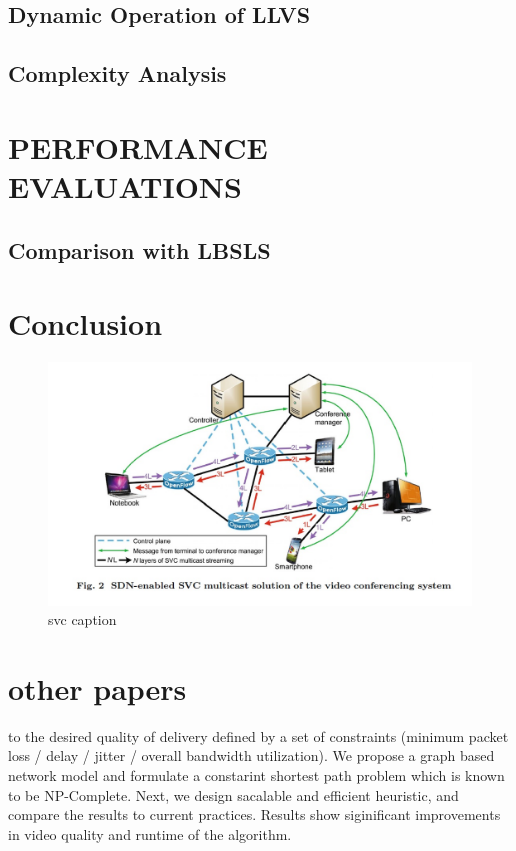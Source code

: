 \documentclass[a4paper, 10pt, conference]{ieeeconf}
\begin{document}
\subsection{Dynamic Operation of LLVS}
\subsection{Complexity Analysis}

\section{PERFORMANCE EVALUATIONS}

\subsection{Comparison with LBSLS}
\subsection{}

\section{Conclusion}

\newpage
\begin{figure}[htbp]
\centering
\includegraphics[scale=0.45]{svc-sdn-video-conf.jpg}
\caption{svc caption}
\label{svc label}
\end{figure}

\addtolength{\textheight}{-12cm}




\section{other papers}
to the desired quality of delivery defined by a set of constraints (minimum
packet loss / delay / jitter / overall bandwidth utilization). We propose
a graph based network model and formulate a constarint shortest path
problem which is known to be NP-Complete. Next, we design sacalable
and efficient heuristic, and compare the results to current practices. Results
show siginificant improvements in video quality and runtime of the
algorithm.
\end{document}
